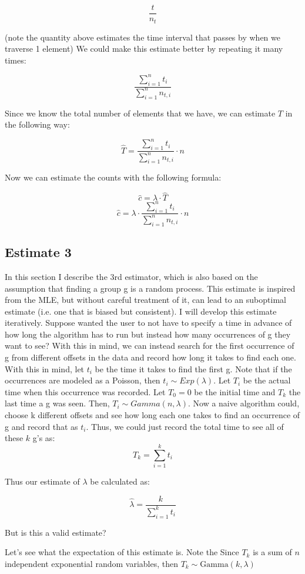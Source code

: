 \documentclass[a4paper]{article}
\begin{document}
$$\frac{t}{n_t}$$

(note the quantity above estimates the time interval that passes by when we traverse 1 element) We could make this estimate better by repeating it many times:

$$\frac{\sum^{n}_{i=1} t_i}{\sum^{n}_{i=1}n_{t, i}}$$

 Since we know the total number of elements that we have, we can estimate $T$ in the following way:

$$\hat{T} = \frac{\sum^{n}_{i=1} t_i}{\sum^{n}_{i=1}n_{t, i}} \cdot n$$

Now we can estimate the counts with the following formula:

$$\hat{c} = \lambda \cdot \hat{T} $$
$$\hat{c}  = \lambda \cdot \frac{\sum^{n}_{i=1} t_i}{\sum^{n}_{i=1}n_{t, i}} \cdot n$$

\subsection{Estimate 3}

In this section I describe the 3rd estimator, which is also based on the assumption that finding a group g is a random process.
This estimate is inspired from the MLE, but without careful treatment of it, can lead to an suboptimal estimate (i.e. one that is biased but consistent).
I will develop this estimate iteratively.
Suppose wanted the user to not have to specify a time in advance of how long the algorithm has to run but instead how many occurrences of g they want to see?
With this in mind, we can instead search for the first occurrence of g from different offsets in the data and record how long it takes to find each one.
With this in mind, let $t_i$ be the time it takes to find the first g.
Note that if the occurrences are modeled as a Poisson, then $t_i \sim Exp(\lambda)$.
Let $T_i$ be the actual time when this occurrence was recorded.
Let $T_0 = 0$ be the initial time and $T_k$ the last time a g was seen.
Then, $T_i \sim Gamma(n, \lambda)$.
Now a naive algorithm could, choose k different offsets and see how long each one takes to find an occurrence of g and record that as $t_i$.
Thus, we could just record the total time to see all of these $k$ g's as: 
$$ T_k = \sum^{k}_{i=1} t_i$$

Thus our estimate of $\lambda$ be calculated as:

$$\hat{\lambda} = \frac{k}{\sum^{k}_{i=1} t_i}$$

But is this a valid estimate?

Let's see what the expectation of this estimate is.
Note the Since $T_k$ is a sum of $n$ independent exponential random variables, then $T_k\sim\mathrm{Gamma}(k,\lambda)$
\end{document}
